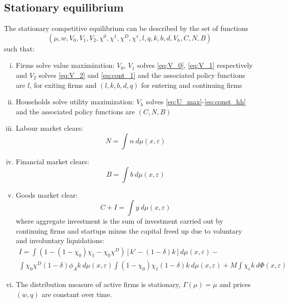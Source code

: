 \documentclass[12pt]{article}
\begin{document}
\subsection{Stationary equilibrium}\label{sec:eq}
The stationary competitive equilibrium can be described by the set of functions
$$(\mu, w, V_0, V_1, V_2, \chi^0, \chi^1, \chi^D, \chi^e, l,q,k,b,d, V_h, C, N, B)$$
such that: 
\begin{enumerate}[(i)]
\item Firms solve value maximization: $V_0$, $V_1$ solves \ref{eq:V_0}, \ref{eq:V_1} respectively and $V_2$ solves \ref{eq:V_2} and \ref{eq:cont_1} and the associated policy functions are $l$, for exiting firms and $(l,k,b,d,q)$ for entering and continuing firms
\item Households solve utility maximization: $V_h$ solves \ref{eq:U_max}-\ref{eq:const_hh} and the associated policy functions are $( C, N, B)$
\item Labour market clears: 
$$ N = \int n  \ d \mu (x,\varepsilon)  $$
\item Financial market clears:
 $$ B = \int b \ d \mu (x,\varepsilon) $$
\item Goods market clear: 
$$ C + I = \int y \ d \mu (x,\varepsilon)$$
where aggregate investment is the sum of investment carried out by continuing firms and startups minus the capital freed up due to voluntary and involuntary liquidations:
\begin{multline*} 
    I = \int (1-(1-\chi_0)\chi_1-\chi_0\chi^D)\left[ k' -(1-\delta)k \right] d \mu (x,\varepsilon) - \\
    \int \chi_0\chi^D (1-\delta) \phi_A k \ d \mu (x,\varepsilon) \int (1-\chi_0)\chi_1(1-\delta) k \ d \mu (x,\varepsilon)  + M \int \chi_e k \ d \Phi(x,\varepsilon) 
\end{multline*}
\item The distribution measure of active firms is stationary, $\Gamma(\mu) = \mu$ and prices $(w,q)$ are constant over time.
\end{enumerate}
\end{document}

